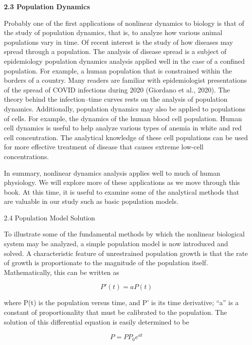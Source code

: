 \documentclass[12pt]{article}
\begin{document}
\hfill

\textbf{2.3 Population Dynamics}

\hfill


Probably one of the first applications of nonlinear dynamics to biology is that of the
study of population dynamics, that is, to analyze how various animal populations
vary in time. Of recent interest is the study of how diseases may spread through a
population. The analysis of disease spread is a subject of epidemiology population
dynamics analysis applied well in the case of a confined population. For example, a
human population that is constrained within the borders of a country. Many readers
are familiar with epidemiologist presentations of the spread of COVID infections
during 2020 (Giordano et al., 2020). The theory behind the infection–time curves
rests on the analysis of population dynamics. Additionally, population dynamics
may also be applied to populations of cells. For example, the dynamics of the human
blood cell population. Human cell dynamics is useful to help analyze various types
of anemia in white and red cell concentration. The analytical knowledge of these
cell populations can be used for more effective treatment of disease that causes
extreme low-cell concentrations.

\hfill

In summary, nonlinear dynamics analysis applies well to much of human physiology.
We will explore more of these applications as we move through this book. At
this time, it is useful to examine some of the analytical methods that are valuable in
our study such as basic population models.

\hfill

2.4 Population Model Solution

\hfill

To illustrate some of the fundamental methods by which the nonlinear biological
system may be analyzed, a simple population model is now introduced and solved.
A characteristic feature of unrestrained population growth is that the rate of growth
is proportionate to the magnitude of the population itself. Mathematically, this can
be written as

\[
P'(t) = aP(t)
\]

where P(t) is the population versus time, and P' is its time derivative; “a” is a constant
of proportionality that must be calibrated to the population. The solution of
this differential equation is easily determined to be

\[
P = PP_0 e^{at}
\]
\end{document}
